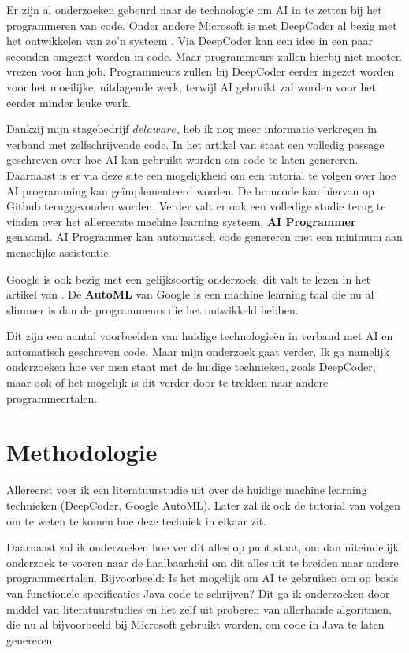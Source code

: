 Er zijn al onderzoeken gebeurd naar de technologie om AI in te zetten bij het programmeren van code. Onder andere Microsoft is met DeepCoder al bezig met het ontwikkelen van zo'n systeem \autocite{DeepCoder}. Via DeepCoder kan een idee in een paar seconden omgezet worden in code. Maar programmeurs zullen hierbij niet moeten vrezen voor hun job. Programmeurs zullen bij DeepCoder eerder ingezet worden voor het moeilijke, uitdagende werk, terwijl AI gebruikt zal worden voor het eerder minder leuke werk.

Dankzij mijn stagebedrijf \(delaware\), heb ik nog meer informatie verkregen in verband met zelfschrijvende code. In het artikel van  \textcite{primaryObject} staat een volledig passage geschreven over hoe AI kan gebruikt worden om code te laten genereren. Daarnaast is er via deze site een mogelijkheid om een tutorial te volgen over hoe AI programming kan geïmplementeerd worden. De broncode kan hiervan op Github \autocite{github} teruggevonden worden. Verder valt er ook een volledige studie \autocite{aiProgrammer} terug te vinden over het allereerste machine learning systeem, \textbf{AI Programmer} genaamd. AI Programmer kan automatisch code genereren met een minimum aan menselijke assistentie.

Google is ook bezig met een gelijksoortig onderzoek, dit valt te lezen in het artikel van \textcite{greene}. De \textbf{AutoML} van Google is een machine learning taal die nu al slimmer is dan de programmeurs die het ontwikkeld hebben.

Dit zijn een aantal voorbeelden van huidige technologieën in verband met AI en automatisch geschreven code. Maar mijn onderzoek gaat verder. Ik ga namelijk onderzoeken hoe ver men staat met de huidige technieken, zoals DeepCoder, maar ook of het mogelijk is dit verder door te trekken naar andere programmeertalen.

\section{Methodologie}
\label{sec:methodologie}

Allereerst voer ik een literatuurstudie uit over de huidige machine learning technieken (DeepCoder, Google AutoML). Later zal ik ook de tutorial van \textcite{github} volgen om te weten te komen hoe deze techniek in elkaar zit.

Daarnaast zal ik onderzoeken hoe ver dit alles op punt staat, om dan uiteindelijk onderzoek te voeren naar de haalbaarheid om dit alles uit te breiden naar andere programmeertalen. Bijvoorbeeld: Is het mogelijk om AI te gebruiken om op basis van functionele specificaties Java-code te schrijven? Dit ga ik onderzoeken door middel van literatuurstudies en het zelf uit proberen van allerhande algoritmen, die nu al bijvoorbeeld bij Microsoft gebruikt worden, om code in Java te laten genereren. 

